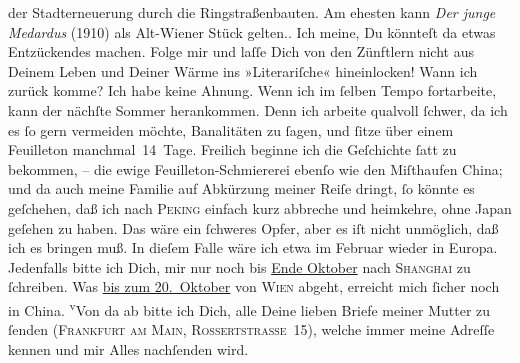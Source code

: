\begin{ledgroupsized}[t]{13cm}
{{{                  der Stadterneuerung durch die Ringstraßenbauten. Am ehesten kann \emph{Der junge
                     Medardus} (1910) als Alt-Wiener Stück gelten.}}}\label{K_L02854-112h}. Ich meine, Du könnteſt da etwas Entzückendes
               machen. Folge mir und laſſe Dich von den Zünftlern nicht aus Deinem Leben und Deiner
               Wärme ins »Literariſche« hineinlocken!\pend
           \pstart
           {\pb}Wann ich zurück komme? Ich habe keine Ahnung. Wenn
               ich im ſelben Tempo fortarbeite, kann der nächſte Sommer herankommen. Denn ich
               arbeite qualvoll ſchwer, da ich es ſo gern vermeiden möchte, Banalitäten zu ſagen,
               und ſitze über einem Feuilleton manchmal 14 Tage. Freilich beginne ich die Geſchichte
               ſatt zu bekommen, – die ewige Feuilleton-Schmiererei ebenſo wie den Miſthaufen China; und da  auch meine Familie auf Abkürzung meiner Reiſe {\pb}dringt, ſo könnte es geſchehen, daß ich nach \textsc{Peking} einfach kurz abbreche und heimkehre, ohne Japan geſehen zu haben. Das wäre ein ſchweres Opfer, aber es iſt nicht
               unmöglich, daß ich es bringen muß. In dieſem Falle wäre ich etwa im Februar wieder in Europa. Jedenfalls bitte ich Dich, mir nur noch bis \uline{Ende Oktober} nach \textsc{Shanghai} zu ſchreiben. Was \uline{bis zum 20. Oktober} von \textsc{Wien} abgeht, erreicht mich ſicher noch in China. {\pb}\substVorne{}\textsuperscript{v}\substDazwischen{}V\substHinten{}on da ab bitte ich Dich, alle Deine 
               lieben Briefe meiner Mutter
               zu ſenden (\textsc{Frankfurt am Main,  Rossertstraße 15}), welche  immer meine
               Adreſſe kennen und mir Alles nachſenden wird.\pend

\end{ledgroupsized}
